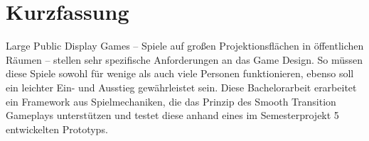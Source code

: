 \chapter{Kurzfassung}

Large Public Display Games -- Spiele auf großen Projektionsflächen in öffentlichen Räumen -- stellen sehr spezifische Anforderungen an das Game Design. So müssen diese Spiele sowohl für wenige als auch viele Personen funktionieren, ebenso soll ein leichter Ein- und Ausstieg gewährleistet sein. Diese Bachelorarbeit erarbeitet ein Framework aus Spielmechaniken, die das Prinzip des Smooth Transition Gameplays unterstützen und testet diese anhand eines im Semesterprojekt 5 entwickelten Prototyps.